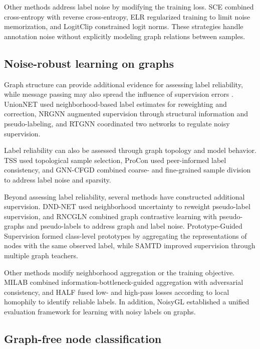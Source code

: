 \documentclass[10pt,letterpaper,nopreprintline]{elsarticle}
\theoremstyle{definition}
\theoremstyle{plain}
\begin{document}
Other methods address label noise by modifying the training loss. SCE \cite{ref23} combined cross-entropy with reverse cross-entropy, ELR \cite{ref24} regularized training to limit noise memorization, and LogitClip \cite{ref26} constrained logit norms. These strategies handle annotation noise without explicitly modeling graph relations between samples.

\subsection{Noise-robust learning on graphs}\label{sec:2.2}

Graph structure can provide additional evidence for assessing label reliability, while message passing may also spread the influence of supervision errors \cite{ref6}. UnionNET \cite{ref27} used neighborhood-based label estimates for reweighting and correction, NRGNN \cite{ref7} augmented supervision through structural information and pseudo-labeling, and RTGNN \cite{ref8} coordinated two networks to regulate noisy supervision.

Label reliability can also be assessed through graph topology and model behavior. TSS \cite{ref9} used topological sample selection, ProCon \cite{ref29} used peer-informed label consistency, and GNN-CFGD \cite{ref31} combined coarse- and fine-grained sample division to address label noise and sparsity.

Beyond assessing label reliability, several methods have constructed additional supervision. DND-NET \cite{ref32} used neighborhood uncertainty to reweight pseudo-label supervision, and RNCGLN \cite{ref33} combined graph contrastive learning with pseudo-graphs and pseudo-labels to address graph and label noise. Prototype-Guided Supervision \cite{ref34} formed class-level prototypes by aggregating the representations of nodes with the same observed label, while SAMTD \cite{ref36} improved supervision through multiple graph teachers.

Other methods modify neighborhood aggregation or the training objective. MILAB \cite{ref38} combined information-bottleneck-guided aggregation with adversarial consistency, and HALF \cite{ref39} fused low- and high-pass losses according to local homophily to identify reliable labels. In addition, NoisyGL \cite{ref6} established a unified evaluation framework for learning with noisy labels on graphs.

\subsection{Graph-free node classification}\label{sec:2.3}
\end{document}

